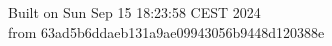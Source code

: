 {\noindent Built on Sun Sep 15 18:23:58 CEST 2024} \\ 
 {\noindent from 63ad5b6ddaeb131a9ae09943056b9448d120388e}
